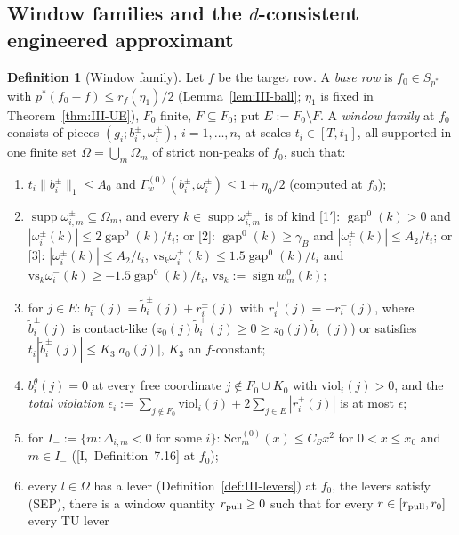 \documentclass[10pt]{amsart}
\theoremstyle{definition}
\newtheorem{definition}[theorem]{Definition}
\theoremstyle{remark}
\newcommand{\supp}{\operatorname{supp}}
\newcommand{\sgn}{\operatorname{sign}}
\newcommand{\gap}{\operatorname{gap}}
\begin{document}
\subsection{Window families and the $d$-consistent engineered approximant}
\label{subsec:III-window}

\begin{definition}[Window family]\label{def:III-window}
Let $f$ be the target row.  A \emph{base row} is $f_0\in S_{p^*}$ with
$p^*(f_0-f)\le r_f(\eta_1)/2$ (Lemma~\ref{lem:III-ball}; $\eta_1$ is fixed in
Theorem~\ref{thm:III-UE}), $F_0$ finite, $F\subseteq F_0$; put $E:=F_0\setminus F$.
A \emph{window family} at $f_0$ consists of pieces $(g_i;b^\pm_i,\omega^\pm_i)$,
$i=1,\dots,n$, at scales $t_i\in[T,t_1]$, all supported in one finite set
$\Omega=\bigcup_m\Omega_m$ of strict non-peaks of $f_0$, such that:
\begin{enumerate}
\item[(U1)] $t_i\|b^\pm_i\|_1\le A_0$ and $\Gamma^{(0)}_w(b^\pm_i,\omega^\pm_i)\le
1+\eta_0/2$ (computed at $f_0$);
\item[(U2)] $\supp\omega^\pm_{i,m}\subseteq\Omega_m$, and every $k\in\supp
\omega^\pm_{i,m}$ is of kind \textup{[1$'$]}: $\gap^0(k)>0$ and $|\omega^\pm_i(k)|
\le2\gap^0(k)/t_i$; or \textup{[2]}: $\gap^0(k)\ge\gamma_B$ and
$|\omega^\pm_i(k)|\le A_2/t_i$; or \textup{[3]}: $|\omega^\pm_i(k)|\le A_2/t_i$,
$\mathrm{vs}_k\omega^+_i(k)\le1.5\gap^0(k)/t_i$ and $\mathrm{vs}_k\omega^-_i(k)\ge
-1.5\gap^0(k)/t_i$, $\mathrm{vs}_k:=\sgn w^0_m(k)$;
\item[(U3)] for $j\in E$: $b^\pm_i(j)=\tilde b^\pm_i(j)+r^\pm_i(j)$ with
$r^+_i(j)=-r^-_i(j)$, where $\tilde b^\pm_i(j)$ is contact-like
($z_0(j)\tilde b^+_i(j)\ge0\ge z_0(j)\tilde b^-_i(j)$) or satisfies
$t_i|\tilde b^\pm_i(j)|\le K_3|a_0(j)|$, $K_3$ an $f$-constant;
\item[(U4)] $b^\theta_i(j)=0$ at every free coordinate $j\notin F_0\cup K_0$ with
$\mathrm{viol}_i(j)>0$, and the \emph{total violation}
$\epsilon_i:=\sum_{j\notin F_0}\mathrm{viol}_i(j)+2\sum_{j\in E}|r^+_i(j)|$ is
at most $\epsilon$;
\item[(U5)] for $I_-:=\{m:\Delta_{i,m}<0\text{ for some }i\}$:
$\mathrm{Scr}^{(0)}_m(x)\le C_Sx^2$ for $0<x\le x_0$ and $m\in I_-$
\textup{(}[I,~Definition~7.16] at $f_0$\textup{)};
\item[(U6)] every $l\in\Omega$ has a lever (Definition~\ref{def:III-levers}) at
$f_0$, the levers satisfy \textup{(SEP)}, there is a window quantity
$r_{\rm pull}\ge0$ such that for every $r\in[r_{\rm pull},r_0]$ every TU lever

\end{enumerate}
\end{definition}
\end{document}

